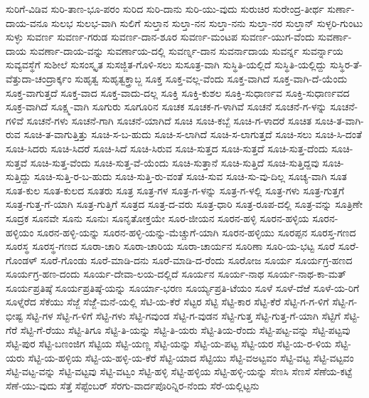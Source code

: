 ಸುರಿಗೆ-ವಿಡಿವ
ಸುರಿ-ತಾಣ-ಭೂ-ಪರಂ
ಸುರಿದ
ಸುರಿ-ದಾನು
ಸುರಿ-ಯು-ವುದು
ಸುರುಚಿರ
ಸುರೇಂದ್ರ-ತೀರ್ಥ
ಸುರ್ಣಾ-ದಾಯ-ವನೂ
ಸುಲಭ
ಸುಲಭ-ವಾಗಿ
ಸುಲಿಗೆ
ಸುಲ್ತಾನ
ಸುಲ್ತಾ-ನನ
ಸುಲ್ತಾ-ನನು
ಸುಲ್ತಾ-ನರ
ಸುಲ್ತಾನ್
ಸುಳ್ಳರಿ-ಗುಂಟು
ಸುಳ್ಳು
ಸುವರ್ಣ
ಸುವರ್ಣ-ಗರುಡ
ಸುವರ್ಣ-ದಾನ-ಶೂರ
ಸುವರ್ಣ-ಮಂಟಪ
ಸುವರ್ಣ-ಯುಗ-ವೆಂದು
ಸುವರ್ಣಾ-ದಾಯ
ಸುವರ್ಣಾ-ದಾಯ-ವನ್ನು
ಸುವರ್ಣಾಯ-ದಲ್ಲಿ
ಸುವರ್ಣ್ನ-ದಾನ
ಸುವರ್ನಾದಾಯ
ಸುವರ್ನ್ನ
ಸುವರ್ನ್ನಾಯ
ಸುವ್ಯವಸ್ಥೆಗೆ
ಸುಶೀಲೆ
ಸುಸಂಸ್ಕೃತ
ಸುಸಜ್ಜಿತ-ಗೊಳಿ-ಸಲು
ಸುಸೂತ್ರ-ವಾಗಿ
ಸುಸ್ಥಿತಿ-ಯಲ್ಲಿದೆ
ಸುಸ್ಥಿತಿ-ಯಲ್ಲಿದ್ದು
ಸುಸ್ಥಿರ-ತೆ-ವೆತ್ತುದಾ-ಚಂದ್ರಾರ್ಕ್ಕಂ
ಸುಹೃತ್ವ
ಸುಹೃತ್ವಕ್ತ್ರಾಬ್ಜ
ಸೂಕ್ತ
ಸೂಕ್ತ-ವಲ್ಲ-ವೆಂದು
ಸೂಕ್ತ-ವಾಗಿದೆ
ಸೂಕ್ತ-ವಾಗಿ-ದೆ-ಯೆಂದು
ಸೂಕ್ತ-ವಾಗುತ್ತದೆ
ಸೂಕ್ತ-ವಾದ
ಸೂಕ್ತ-ವಾದು-ದಲ್ಲ
ಸೂಕ್ತಿ
ಸೂಕ್ತಿ-ಕುಶಲ
ಸೂಕ್ತಿ-ಸುಧಾರ್ಣವ
ಸೂಕ್ತಿ-ಸುಧಾರ್ಣವದ
ಸೂಕ್ರ-ವಾಗಿದೆ
ಸೂಕ್ಷ್ಮ-ವಾಗಿ
ಸೂಗುರು
ಸೂಗೂರಿನ
ಸೂಚಕ
ಸೂಚಕ-ಗ-ಳಾಗಿವೆ
ಸೂಚನೆ
ಸೂಚನೆ-ಗ-ಳನ್ನು
ಸೂಚನೆ-ಗಳಿವೆ
ಸೂಚನೆ-ಗಳು
ಸೂಚನೆ-ಗಾಗಿ
ಸೂಚನೆ-ಯಾಗಿದೆ
ಸೂಚಿ
ಸೂಚಿ-ಕಬ್ಬೆ
ಸೂಚಿ-ಗ-ಳಾದರೆ
ಸೂಚಿತ
ಸೂಚಿ-ತ-ವಾಗಿ-ರುವ
ಸೂಚಿ-ತ-ವಾಗುತ್ತಿತ್ತು
ಸೂಚಿ-ಸ-ಬ-ಹುದು
ಸೂಚಿ-ಸ-ಲಾಗಿದೆ
ಸೂಚಿ-ಸ-ಲಾಗುತ್ತದೆ
ಸೂಚಿ-ಸಲು
ಸೂಚಿ-ಸಿ-ದಂತೆ
ಸೂಚಿ-ಸಿದರು
ಸೂಚಿ-ಸಿದರೆ
ಸೂಚಿ-ಸಿದೆ
ಸೂಚಿ-ಸಿರುವ
ಸೂಚಿ-ಸುತ್ತದ
ಸೂಚಿ-ಸುತ್ತದೆ
ಸೂಚಿ-ಸುತ್ತ-ದೆಂದು
ಸೂಚಿ-ಸುತ್ತವೆ
ಸೂಚಿ-ಸುತ್ತ-ವೆಂದು
ಸೂಚಿ-ಸುತ್ತ-ವೆ-ಯೆಂದು
ಸೂಚಿ-ಸುತ್ತಾನೆ
ಸೂಚಿ-ಸುತ್ತಿದೆ
ಸೂಚಿ-ಸುತ್ತಿದ್ದವು
ಸೂಚಿ-ಸುತ್ತಿದ್ದು
ಸೂಚಿ-ಸುತ್ತಿ-ರ-ಬ-ಹುದು
ಸೂಚಿ-ಸುತ್ತಿ-ರು-ವಂತೆ
ಸೂಚಿ-ಸುವ
ಸೂಚಿ-ಸು-ವು-ದಿಲ್ಲ
ಸೂಚ್ಯ-ವಾಗಿ
ಸೂತ
ಸೂತ-ಕುಲ
ಸೂತ-ಕುಲದ
ಸೂತರು
ಸೂತ್ರ
ಸೂತ್ರ-ಗಳ
ಸೂತ್ರ-ಗ-ಳನ್ನು
ಸೂತ್ರ-ಗ-ಳಲ್ಲಿ
ಸೂತ್ರ-ಗಳು
ಸೂತ್ರ-ಗುತ್ತಗೆ
ಸೂತ್ರ-ಗುತ್ತ-ಗೆ-ಯಾಗಿ
ಸೂತ್ರ-ಗುತ್ತಿಗೆ
ಸೂತ್ರದ
ಸೂತ್ರ-ದ-ವರು
ಸೂತ್ರ-ಧಾರಿ
ಸೂತ್ರ-ರೂಪ-ದಲ್ಲಿ
ಸೂತ್ರ-ವನ್ನು
ಸೂತ್ರಿಣೇ
ಸೂದ್ರಕ
ಸೂನವೇ
ಸೂನು
ಸೂನುಃ
ಸೂನೃತೋಕ್ತಯೇ
ಸೂರ-ಜೀಯನ
ಸೂರನ-ಹಳ್ಳಿ
ಸೂರನ-ಹಳ್ಳಿಯ
ಸೂರನ-ಹಳ್ಳಿಯಂ
ಸೂರನ-ಹಳ್ಳಿ-ಯನ್ನು
ಸೂರನ-ಹಳ್ಳಿ-ಯನ್ನು-ಮೆಚ್ಚುಗೆ-ಯಾಗಿ
ಸೂರನ-ಹಳ್ಳಿಯು
ಸೂರಪ್ಪನ
ಸೂರಸ್ತ-ಗಣದ
ಸೂರಸ್ಥ
ಸೂರಸ್ಥ-ಗಣದ
ಸೂರಾ-ಚಾರಿ
ಸೂರಾ-ಚಾರಿಯ
ಸೂರಾ-ಚಾರ್ಯನ
ಸೂರಿಣಾ
ಸೂರಿ-ಯ-ಭಟ್ಟ
ಸೂರೆ
ಸೂರೆ-ಗೊಂಡಳ್
ಸೂರೆ-ಗೊಂಡು
ಸೂರೆ-ಮಾಡಿ-ದನು
ಸೂರೆ-ಮಾಡಿ-ದ-ರೆಂದು
ಸೂರೋಜ
ಸೂರ್ಯ
ಸೂರ್ಯಗ್ರ-ಹಣದ
ಸೂರ್ಯಗ್ರ-ಹಣ-ದಂದು
ಸೂರ್ಯ-ದೇವಾ-ಲಯ-ದಲ್ಲಿದೆ
ಸೂರ್ಯನ
ಸೂರ್ಯ-ನಾಥ
ಸೂರ್ಯ-ನಾಥ-ಕಾ-ಮತ್
ಸೂರ್ಯಪ್ರತಿಷ್ಠೆ
ಸೂರ್ಯಪ್ರತಿಷ್ಠೆ-ಯನ್ನು
ಸೂರ್ಯಾ-ಭರಣ
ಸೂರ್ಯ್ಯಪ್ರತಿ-ಟೆಯಂ
ಸೂಳೆ
ಸೂಳೆ-ದೆಱೆ
ಸೂಳೆ-ಯ-ರಿಗೆ
ಸೂಳ್ನೆರೆದ
ಸೆಕೆಯು
ಸೆಜ್ಜೆ
ಸೆಜ್ಜೆೆ-ಮನೆ-ಯಲ್ಲಿ
ಸೆಟಿ-ಯ-ಕೆರೆ
ಸೆಟ್ಟರ
ಸೆಟ್ಟಿ
ಸೆಟ್ಟಿ-ಕಾರ
ಸೆಟ್ಟಿ-ಕೆರೆ
ಸೆಟ್ಟಿ-ಗ-ಗ-ಳಿಗೆ
ಸೆಟ್ಟಿ-ಗ-ಭೀಷ್ಟ
ಸೆಟ್ಟಿ-ಗಳ
ಸೆಟ್ಟಿ-ಗ-ಳಿಗೆ
ಸೆಟ್ಟಿ-ಗಳು
ಸೆಟ್ಟಿ-ಗವುಂಡ
ಸೆಟ್ಟಿ-ಗ-ವುಡನ
ಸೆಟ್ಟಿ-ಗುತ್ತ
ಸೆಟ್ಟಿ-ಗುತ್ತ-ಗೆ-ಯಾಗಿ
ಸೆಟ್ಟಿಗೆ
ಸೆಟ್ಟಿ-ಗೆರೆ
ಸೆಟ್ಟಿ-ಗೆ-ರೆಯು
ಸೆಟ್ಟಿ-ತಿಗೂ
ಸೆಟ್ಟಿ-ತಿ-ಯನ್ನು
ಸೆಟ್ಟಿ-ತಿ-ಯರು
ಸೆಟ್ಟಿ-ತಿಯ-ರೆಂದು
ಸೆಟ್ಟಿ-ಪಟ್ಟ-ವನ್ನು
ಸೆಟ್ಟಿ-ಪಟ್ಟವು
ಸೆಟ್ಟಿ-ಪುರ
ಸೆಟ್ಟಿ-ಬಣಂಜಿಗ
ಸೆಟ್ಟಿಯ
ಸೆಟ್ಟಿ-ಯಣ್ಣ
ಸೆಟ್ಟಿ-ಯನ್ನು
ಸೆಟ್ಟಿ-ಯ-ಪಟ್ಟ
ಸೆಟ್ಟಿ-ಯರ
ಸೆಟ್ಟಿ-ಯ-ರ-ಳಿಯ
ಸೆಟ್ಟಿ-ಯರು
ಸೆಟ್ಟಿ-ಯ-ಹಳ್ಳಿಯ
ಸೆಟ್ಟಿ-ಯ-ಹಳ್ಳಿ-ಯ-ಕೆರೆ
ಸೆಟ್ಟಿ-ಯಾದ
ಸೆಟ್ಟಿಯು
ಸೆಟ್ಟಿ-ವಅಟ್ಟವಂ
ಸೆಟ್ಟಿ-ವಟ್ಟ
ಸೆಟ್ಟಿ-ವಟ್ಟವಂ
ಸೆಟ್ಟಿ-ವಟ್ಟ-ವನ್ನು
ಸೆಟ್ಟಿ-ವಟ್ಟವು
ಸೆಟ್ಟಿ-ವಟ್ವಂ
ಸೆಟ್ಟಿ-ಹಳ್ಳಿ
ಸೆಟ್ಟಿ-ಹಳ್ಳಿಯ
ಸೆಟ್ಟಿ-ಹಳ್ಳಿ-ಯನ್ನು
ಸೆಣಸಿ
ಸೆಣಸೆ
ಸೆಣೆಯ-ಕಟ್ಟೆ
ಸೆಣೆ-ಯು-ವುದು
ಸೆತ್ತೆ
ಸೆಪ್ಟೆಂಬರ್
ಸೆರಗು-ವಾರ್ದಪೊರಿನ್ನಿರ-ನೆಂದು
ಸೆರೆ-ಯಲ್ಲಿಟ್ಟನು
